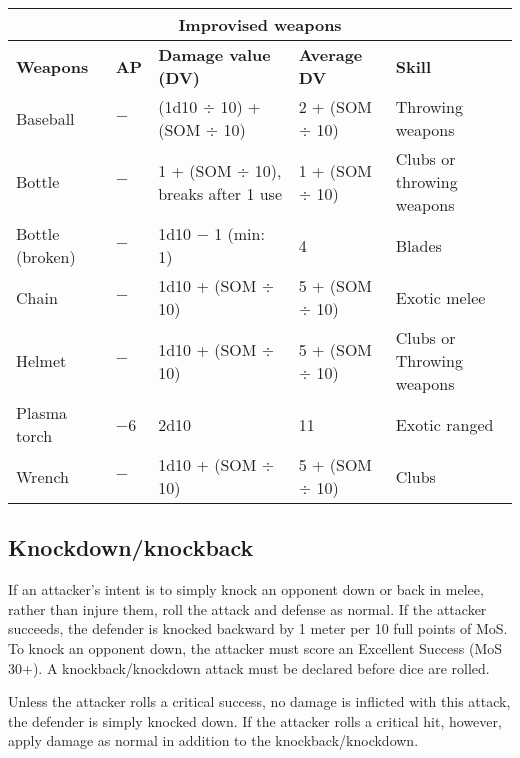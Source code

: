 \begin{table} \begin{tabularx}{\textwidth}{|l|l|l|l|X|} \hline

\multicolumn{5}{|c|}{\textbf{Improvised weapons}} \\ \hline

\textbf{Weapons}	&\textbf{AP}	&\textbf{Damage value (DV)}	&\textbf{Average DV}	&\textbf{Skill}	\\ \hline

Baseball	&$-$	&(1d10 $\div$ 10) + (SOM $\div$ 10)	&2 + (SOM $\div$ 10)	&Throwing weapons	\\ \hline

Bottle	&$-$	&1 + (SOM $\div$ 10), breaks after 1 use	&1 + (SOM $\div$ 10)	&Clubs or throwing weapons	\\ \hline

Bottle (broken)	&$-$	&1d10 $-$ 1 (min: 1)	&4	&Blades	\\ \hline

Chain	&$-$	&1d10 + (SOM $\div$ 10)	&5 + (SOM $\div$ 10)	&Exotic melee	\\ \hline

Helmet	&$-$	&1d10 + (SOM $\div$ 10)	&5 + (SOM $\div$ 10)	&Clubs or Throwing weapons	\\ \hline

Plasma torch	&$-$6	&2d10	&11	&Exotic ranged	\\ \hline

Wrench	&$-$ &1d10 + (SOM $\div$ 10)	&5 + (SOM $\div$ 10)	&Clubs	\\ \hline

\end{tabularx} \label{tab:improvised-weapons} \end{table} 



\subsection{Knockdown/knockback} \label{sec:knockdown-knockback} 

If an attacker’s intent is to simply knock an opponent down or back in melee, rather than injure them, roll the attack and defense as normal. If the attacker succeeds, the defender is knocked backward by 1 meter per 10 full points of MoS. To knock an opponent down, the attacker must score an Excellent Success (MoS 30+). A knockback/knockdown attack must be declared before dice are rolled. 

Unless the attacker rolls a critical success, no damage is inflicted with this attack, the defender is simply knocked down. If the attacker rolls a critical hit, however, apply damage as normal in addition to the knockback/knockdown. 

